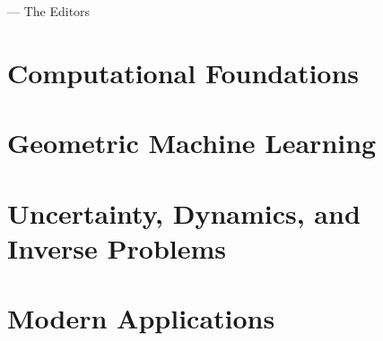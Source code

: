 \documentclass[11pt,oneside]{book}
\theoremstyle{definition}
\begin{document}
\begin{flushright}
--- The Editors
\end{flushright}

\mainmatter

\part{Computational Foundations}
\label{part:foundations}





\part{Geometric Machine Learning}
\label{part:geom_ml}





\part{Uncertainty, Dynamics, and Inverse Problems}
\label{part:uq_dynamics}





\part{Modern Applications}
\label{part:applications}
\end{document}
